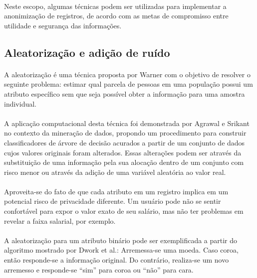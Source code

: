 \paragraph{} Neste escopo, algumas técnicas podem ser utilizadas para implementar a anonimização de registros, de acordo com as metas de compromisso entre utilidade e segurança das informações.

\subsection{Aleatorização e adição de ruído}

\paragraph{} A aleatorização é uma técnica proposta por Warner\cite{warner1965randomized} com o objetivo de resolver o seguinte problema: estimar qual parcela de pessoas em uma população possui um atributo específico sem que seja possível obter a informação para uma amostra individual. 

\paragraph{} A aplicação computacional desta técnica foi demonstrada por Agrawal e Srikant\cite{agrawal2000privacy} no contexto da mineração de dados, propondo um procedimento para construir classificadores de árvore de decisão acurados a partir de um conjunto de dados cujos valores originais foram alterados. Essas alterações podem ser através da substituição de uma informação pela sua alocação dentro de um conjunto com risco menor ou através da adição de uma variável aleatória ao valor real.

\paragraph{} Aproveita-se do fato de que cada atributo em um registro implica em um potencial risco de privacidade diferente. Um usuário pode não se sentir confortável para expor o valor exato de seu salário, mas não ter problemas em revelar a faixa salarial, por exemplo.

\paragraph{} A aleatorização para um atributo binário pode ser exemplificada a partir do algoritmo mostrado por Dwork et al.\cite{dwork2014algorithmic}: Arremessa-se uma moeda. Caso coroa, então responde-se a informação original. Do contrário, realiza-se um novo arremesso e responde-se ``sim'' para coroa ou ``não'' para cara.

